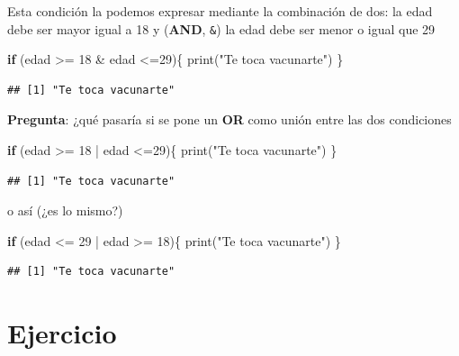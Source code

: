 \documentclass[
]{book}
\newenvironment{Shaded}{\begin{snugshade}}{\end{snugshade}}
\newcommand{\ControlFlowTok}[1]{\textcolor[rgb]{0.13,0.29,0.53}{\textbf{#1}}}
\newcommand{\DecValTok}[1]{\textcolor[rgb]{0.00,0.00,0.81}{#1}}
\newcommand{\FunctionTok}[1]{\textcolor[rgb]{0.00,0.00,0.00}{#1}}
\newcommand{\NormalTok}[1]{#1}
\newcommand{\SpecialCharTok}[1]{\textcolor[rgb]{0.00,0.00,0.00}{#1}}
\newcommand{\StringTok}[1]{\textcolor[rgb]{0.31,0.60,0.02}{#1}}
\begin{document}
Esta condición la podemos expresar mediante la combinación de dos: la edad debe ser mayor igual a 18 y (\textbf{AND}, \texttt{\&}) la edad debe ser menor o igual que 29

\begin{Shaded}
\begin{Highlighting}[]
\ControlFlowTok{if}\NormalTok{ (edad }\SpecialCharTok{\textgreater{}=} \DecValTok{18} \SpecialCharTok{\&}\NormalTok{ edad }\SpecialCharTok{\textless{}=}\DecValTok{29}\NormalTok{)\{}
  \FunctionTok{print}\NormalTok{(}\StringTok{"Te toca vacunarte"}\NormalTok{)}
\NormalTok{\}}
\end{Highlighting}
\end{Shaded}

\begin{verbatim}
## [1] "Te toca vacunarte"
\end{verbatim}

\textbf{Pregunta}: ¿qué pasaría si se pone un \textbf{OR} como unión entre las dos condiciones

\begin{Shaded}
\begin{Highlighting}[]
\ControlFlowTok{if}\NormalTok{ (edad }\SpecialCharTok{\textgreater{}=} \DecValTok{18} \SpecialCharTok{|}\NormalTok{ edad }\SpecialCharTok{\textless{}=}\DecValTok{29}\NormalTok{)\{}
  \FunctionTok{print}\NormalTok{(}\StringTok{"Te toca vacunarte"}\NormalTok{)}
\NormalTok{\}}
\end{Highlighting}
\end{Shaded}

\begin{verbatim}
## [1] "Te toca vacunarte"
\end{verbatim}

o así (¿es lo mismo?)

\begin{Shaded}
\begin{Highlighting}[]
\ControlFlowTok{if}\NormalTok{ (edad }\SpecialCharTok{\textless{}=} \DecValTok{29} \SpecialCharTok{|}\NormalTok{ edad }\SpecialCharTok{\textgreater{}=} \DecValTok{18}\NormalTok{)\{}
  \FunctionTok{print}\NormalTok{(}\StringTok{"Te toca vacunarte"}\NormalTok{)}
\NormalTok{\}}
\end{Highlighting}
\end{Shaded}

\begin{verbatim}
## [1] "Te toca vacunarte"
\end{verbatim}

\hypertarget{ejercicio}{%
\section{Ejercicio}\label{ejercicio}}
\end{document}
